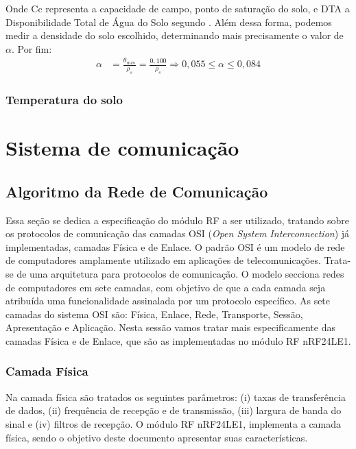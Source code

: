 		Onde Cc representa a capacidade de campo, ponto de saturação do solo, e DTA a Disponibilidade Total de Água do Solo segundo \cite{bib_sen_04_ian}. Além dessa forma, podemos medir a densidade do solo escolhido, determinando mais precisamente o valor de $\alpha$. Por fim:
		\begin{align*}
		\alpha &= \frac{\theta_{min}}{\rho_s} = \frac{0,100}{\rho_s} \Rightarrow 0,055 \leq \alpha \leq 0,084
		\end{align*}



		\subsubsection{Temperatura do solo}


\section{Sistema de comunicação}
		
\subsection{Algoritmo da Rede de Comunicação}

Essa seção se dedica a especificação do módulo RF a ser utilizado, tratando sobre os protocolos de comunicação das camadas OSI (\emph{Open System Interconnection}) já implementadas, camadas Física e de Enlace. O padrão OSI  é um modelo de rede de computadores amplamente utilizado em aplicações de telecomunicações. Trata-se de uma arquitetura para protocolos de comunicação. O modelo secciona redes de computadores em sete camadas, com objetivo de que a cada camada seja atribuída uma funcionalidade assinalada por um protocolo específico. As sete camadas do sistema OSI são: Física, Enlace, Rede, Transporte, Sessão, Apresentação e Aplicação. Nesta sessão vamos tratar mais especificamente das camadas Física e de Enlace, que são as implementadas no módulo RF nRF24LE1.

\subsubsection{Camada Física}

Na camada física são tratados os seguintes parâmetros: (i) taxas de transferência de dados, (ii) frequência de recepção e de transmissão, (iii) largura de banda do sinal e (iv) filtros de recepção. O módulo RF nRF24LE1, implementa a camada física, sendo o objetivo deste documento apresentar suas características.


